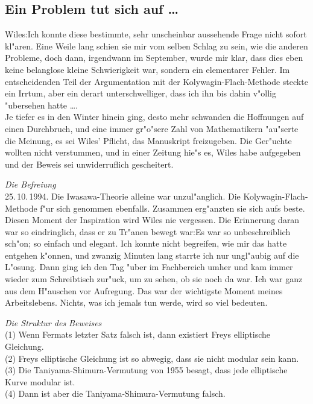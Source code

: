 \documentclass[11pt]{article}
\begin{document}
\subsection*{Ein Problem tut sich auf \dots}
Wiles:\glqq Ich konnte diese bestimmte, sehr unscheinbar aussehende Frage nicht 
sofort kl"aren. Eine Weile lang schien sie mir vom selben Schlag zu sein, wie 
die anderen Probleme, doch dann, irgendwann im September, wurde mir klar, dass 
dies eben keine belanglose kleine Schwierigkeit war, sondern ein elementarer 
Fehler. Im entscheidenden Teil der Argumentation mit der 
Kolywagin-Flach-Methode steckte ein Irrtum, aber ein derart unterschwelliger, 
dass ich ihn bis dahin v"ollig "ubersehen hatte \dots\grqq. 
\\
Je tiefer es in den Winter hinein ging, desto  mehr schwanden die Hoffnungen auf 
einen Durchbruch, und eine immer gr"o"sere Zahl von Mathematikern "au"serte die 
Meinung, es sei Wiles' Pflicht, das Manuskript freizugeben. Die Ger"uchte 
wollten nicht verstummen, und in einer Zeitung hie"s es, Wiles habe aufgegeben 
und der Beweis sei unwiderruflich gescheitert.

{\em Die Befreiung}
\\
25.\,10.\,1994. Die Iwasawa-Theorie alleine war unzul"anglich. Die Kolywagin-Flach-Methode f"ur 
sich genommen ebenfalls. Zusammen erg"anzten sie sich aufs beste. Diesen Moment 
der Inspiration wird Wiles nie vergessen. Die Erinnerung daran war so 
eindringlich, dass er zu Tr"anen bewegt war:\glqq Es war so unbeschreiblich 
sch"on; so einfach und elegant. Ich konnte nicht begreifen, wie mir das hatte 
entgehen k"onnen, und zwanzig Minuten lang starrte ich nur ungl"aubig auf die 
L"osung. Dann ging ich den Tag "uber im Fachbereich umher und kam immer wieder 
zum Schreibtisch zur"uck, um zu sehen, ob sie noch da war. Ich war ganz aus dem 
H"auschen vor Aufregung. Das war der wichtigste Moment meines Arbeitslebens. 
Nichts, was ich jemals tun werde, wird so viel bedeuten.\grqq

{\em Die Struktur des Beweises}
\\
(1) Wenn Fermats letzter Satz falsch ist, dann existiert Freys elliptische 
Gleichung.
\\
(2) Freys elliptische Gleichung ist so abwegig, dass sie nicht modular sein 
kann.
\\
(3) Die Taniyama-Shimura-Vermutung von 1955 besagt, dass jede elliptische Kurve 
modular ist.
\\
(4) Dann ist aber die Taniyama-Shimura-Vermutung falsch.
\end{document}
